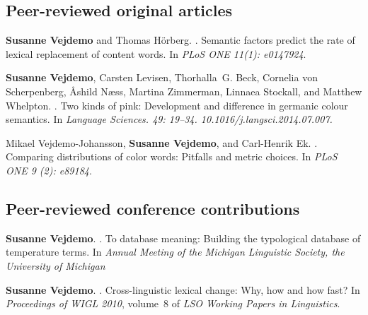 \documentclass[a4paper]{article}
\begin{document}
	
	
			
			
			
	
			\subsection*{\textbf{Peer-reviewed original articles}}	
					
				
					\textbf{Susanne Vejdemo} and Thomas Hörberg.
					.
					\newblock Semantic factors predict the rate of lexical replacement of content
					  words.
					\newblock In \emph{PLoS ONE 11(1): e0147924}.
					
					
						\textbf{Susanne Vejdemo}, Carsten Levisen, Thorhalla~G. Beck, Cornelia von Scherpenberg,
						  Åshild Næss, Martina Zimmerman, Linnaea Stockall, and Matthew Whelpton.
						  .
						\newblock Two kinds of pink: Development and difference in germanic colour
						  semantics.
						  \newblock In \emph{Language Sciences. 49: 19--34. 10.1016/j.langsci.2014.07.007.}
						  
						  	
						  	Mikael Vejdemo-Johansson, \textbf{Susanne Vejdemo}, and Carl-Henrik Ek.
						  	.
						  	\newblock Comparing distributions of color words: Pitfalls and metric choices.
						  	\newblock In \emph{PLoS ONE  9\penalty0 (2): e89184}.
						  	
	

		
		\subsection*{\textbf{Peer-reviewed conference contributions}}
			\textbf{Susanne Vejdemo}.
			.
			\newblock To database meaning: Building the typological database of temperature terms.
			\newblock In \emph{Annual Meeting of the Michigan Linguistic Society, the University of Michigan}
			
			
				
					\textbf{Susanne Vejdemo}.
					.
					\newblock Cross-linguistic lexical change: Why, how and how fast?
					\newblock In \emph{Proceedings of {WIGL} 2010}, volume~8 of \emph{{LSO} Working  Papers in Linguistics}.
			
\end{document}
